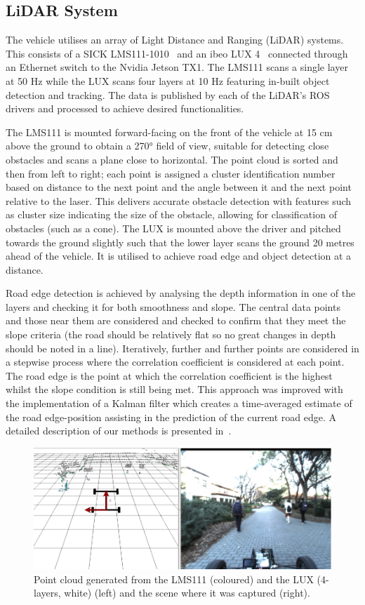 \subsection{LiDAR System}
The vehicle utilises an array of Light Distance and Ranging (LiDAR) systems. This consists of a SICK LMS111-1010~\cite{sick_ag_lms111-10100_nodate} and an ibeo LUX 4~\cite{autonomoustuff_ibeo_nodate} connected through an Ethernet switch to the Nvidia Jetson TX1. The LMS111 scans a single layer at 50 Hz while the LUX scans four layers at 10 Hz featuring in-built object detection and tracking. 
The data is published by each of the LiDAR's ROS drivers and processed to achieve desired functionalities.

The LMS111 is mounted forward-facing on the front of the vehicle at 15 cm above the ground to obtain a \ang{270} field of view, suitable for detecting close obstacles and scans a plane close to horizontal. The point cloud is sorted and then from left to right; each point is assigned a cluster identification number based on distance to the next point and the angle between it and the next point relative to the laser. This delivers accurate obstacle detection with features such as cluster size indicating the size of the obstacle, allowing for classification of obstacles (such as a cone). The LUX is mounted above the driver and pitched towards the ground slightly such that the lower layer scans the ground 20 metres ahead of the vehicle. It is utilised to achieve road edge and object detection at a distance. 

Road edge detection is achieved by analysing the depth information in one of the layers and checking it for both smoothness and slope. The central data points and those near them are considered and checked to confirm that they meet the slope criteria (the road should be relatively flat so no great changes in depth should be noted in a line). Iteratively, further and further points are considered in a stepwise process where the correlation coefficient is considered at each point. The road edge is the point at which the correlation coefficient is the highest whilst the slope condition is still being met. This approach was improved with the implementation of a Kalman filter which creates a time-averaged estimate of the road edge-position assisting in the prediction of the current road edge. A detailed description of our methods is presented in~\cite{drage_lidar_2015}.

\begin{figure}[H]
	\centering
	\includegraphics[width=0.8\linewidth]{pointcloud}
	\caption[Captured scene with its instantaneous LiDAR point cloud]{Point cloud generated from the LMS111 (coloured) and the LUX (4-layers, white) (left) and the scene where it was captured (right).}
	\label{fig:7:pointcloud}
\end{figure}

